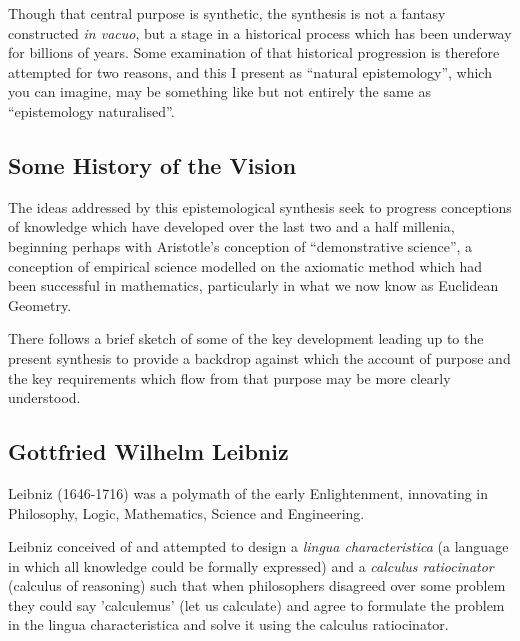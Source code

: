 \documentclass[10pt,titlepage]{book}
\begin{document}
Though that central purpose is synthetic, the synthesis is not a fantasy constructed \emph{in vacuo}, but a stage in a historical process which has been underway for billions of years.
Some examination of that historical progression is therefore attempted for two reasons, and this I present as ``natural epistemology'', which you can imagine, may be something like but not entirely the same as ``epistemology naturalised''.

\subsection{Some History of the Vision}

The ideas addressed by this epistemological synthesis seek to progress conceptions of knowledge which have developed over the last two and a half millenia, beginning perhaps with Aristotle's conception of ``demonstrative science'', a conception of empirical science modelled on the axiomatic method which had been successful in mathematics, particularly in what we now know as Euclidean Geometry.

There follows a brief sketch of some of the key development leading up to the present synthesis to provide a backdrop against which the account of purpose and the key requirements which flow from that purpose may be more clearly understood.

\subsection{Gottfried Wilhelm Leibniz}

Leibniz (1646-1716) was a polymath of the early Enlightenment, innovating in Philosophy, Logic, Mathematics, Science and Engineering. 

Leibniz conceived of and attempted to design a \emph{lingua characteristica} (a language in which all knowledge could be formally expressed) and a \emph{calculus ratiocinator} (calculus of reasoning) such that when philosophers disagreed over some problem they could say 'calculemus' (let us calculate) and agree to formulate the problem in the lingua characteristica and solve it using the calculus ratiocinator.
\end{document}
